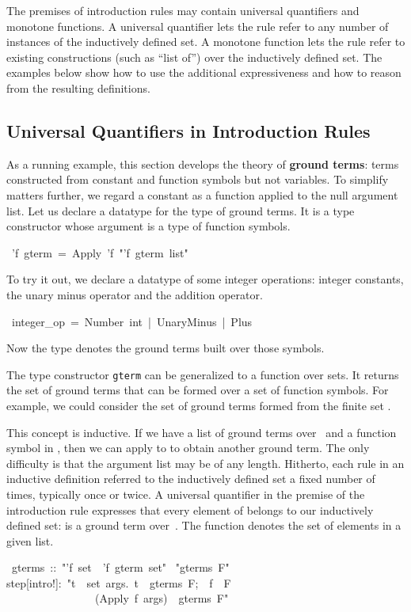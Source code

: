 The premises of introduction rules may contain universal quantifiers and
monotone functions.  A universal quantifier lets the rule 
refer to any number of instances of 
the inductively defined set.  A monotone function lets the rule refer
to existing constructions (such as ``list of'') over the inductively defined
set.  The examples below show how to use the additional expressiveness
and how to reason from the resulting definitions.

\subsection{Universal Quantifiers in Introduction Rules}
\label{sec:gterm-datatype}

As a running example, this section develops the theory of \textbf{ground
terms}: terms constructed from constant and function 
symbols but not variables. To simplify matters further, we regard a
constant as a function applied to the null argument  list.  Let us declare a
datatype  for the type of ground  terms. It is a type constructor
whose argument is a type of  function symbols. 
\begin{isabelle}
\ 'f\ gterm\ =\ Apply\ 'f\ "'f\ gterm\ list"
\end{isabelle}
To try it out, we declare a datatype of some integer operations: 
integer constants, the unary minus operator and the addition 
operator. 
\begin{isabelle}
\ integer_op\ =\ Number\ int\ |\ UnaryMinus\ |\ Plus
\end{isabelle}
Now the type  denotes the ground 
terms built over those symbols.

The type constructor \texttt{gterm} can be generalized to a function 
over sets.  It returns 
the set of ground terms that can be formed over a set  of function symbols. For
example,  we could consider the set of ground terms formed from the finite 
set .

This concept is inductive. If we have a list  of ground terms 
over~ and a function symbol  in , then we 
can apply  to   to obtain another ground term. 
The only difficulty is that the argument list may be of any length. Hitherto, 
each rule in an inductive definition referred to the inductively 
defined set a fixed number of times, typically once or twice. 
A universal quantifier in the premise of the introduction rule 
expresses that every element of  belongs
to our inductively defined set: is a ground term 
over~.  The function  denotes the set of elements in a given 
list. 
\begin{isabelle}
\ gterms\ ::\ "'f\ set\ \isasymRightarrow \ 'f\ gterm\ set"\isanewline
{}\ "gterms\ F"\isanewline
{}\isanewline
step[intro!]:\ "\isasymlbrakk \isasymforall t\ \isasymin \ set\ args.\ t\ \isasymin \ gterms\ F;\ \ f\ \isasymin \ F\isasymrbrakk \isanewline
\ \ \ \ \ \ \ \ \ \ \ \ \ \ \ \isasymLongrightarrow \ (Apply\ f\ args)\ \isasymin \ gterms\
F"
\end{isabelle}

